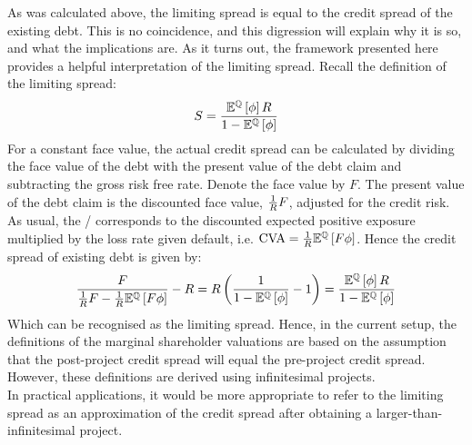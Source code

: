 \documentclass[main.tex]{subfiles}
\begin{document}
    As was calculated above, the limiting spread is equal to the credit spread of the existing debt.
    This is no coincidence, and this digression will explain why it is so,
    and what the implications are.
    As it turns out, 
    the framework presented here provides a helpful interpretation of the limiting spread.
    Recall the definition of the limiting spread:
        \begin{equation*}
            S
            =
            \frac{
                \mathbb{E}^{\mathbb{Q}}\left[\phi\right]
                R
            }{
                1
                -
                \mathbb{E}^{\mathbb{Q}}\left[\phi\right]
            }
        \end{equation*}
    For a constant face value,
    the actual credit spread can be calculated by dividing the face value of the debt
    with the present value of the debt claim and subtracting the gross risk free rate.
    Denote the face value by $F$. 
    The present value of the debt claim is the discounted face value, $\frac{1}{R} F$,
    adjusted for the credit risk. 
    As usual, the \CVA/ corresponds to the discounted expected positive exposure
    multiplied by the loss rate given default, 
    i.e. $\CVA/ = \discountfactor\mathbb{E}^{\rnmeasure}\left[F \phi \right] $.
    Hence the credit spread of existing debt is given by:
        \begin{equation*}
            \frac{
                F
            }{
                \frac{1}{R} F
                -
                \frac{1}{R}
                \mathbb{E}^{\mathbb{Q}}\left[
                    F \phi
                \right] 
            } 
            -
            R
            =
            R \left(
            \frac{
                1
            }{
                    1
                    -
                    \mathbb{E}^{\mathbb{Q}}\left[
                        \phi
                    \right] 
            } 
            - 
            1
            \right)
            =
            \frac{
                \mathbb{E}^{\mathbb{Q}}\left[\phi\right]
                R
            }{
                1
                -
                \mathbb{E}^{\mathbb{Q}}\left[\phi\right]
            }
        \end{equation*}
        Which can be recognised as the limiting spread. 
        Hence, in the current setup, 
        the definitions of the marginal shareholder valuations are based on
        the assumption that the post-project credit spread 
        will equal the pre-project credit spread.
        However, these definitions are derived using infinitesimal projects.
        \\
        In practical applications,
        it would be more appropriate to refer to the limiting spread as an approximation 
        of the credit spread after obtaining a larger-than-infinitesimal project.
        
\end{document}
